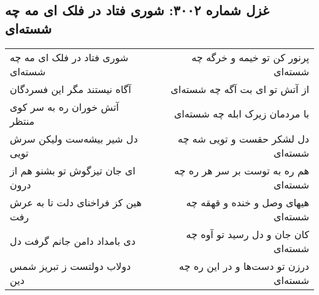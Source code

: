 \begin{center}
\section*{غزل شماره ۳۰۰۲: شوری فتاد در فلک ای مه چه شسته‌ای}
\label{sec:3002}
\begin{longtable}{l p{0.5cm} r}
شوری فتاد در فلک ای مه چه شسته‌ای
&&
پرنور کن تو خیمه و خرگه چه شسته‌ای
\\
آگاه نیستند مگر این فسردگان
&&
از آتش تو ای بت آگه چه شسته‌ای
\\
آتش خوران ره به سر کوی منتظر
&&
با مردمان زیرک ابله چه شسته‌ای
\\
دل شیر بیشه‌ست ولیکن سرش تویی
&&
دل لشکر حقست و تویی شه چه شسته‌ای
\\
ای جان تیزگوش تو بشنو هم از درون
&&
هم ره به توست بر سر هر ره چه شسته‌ای
\\
هین کز فراخنای دلت تا به عرش رفت
&&
هیهای وصل و خنده و قهقه چه شسته‌ای
\\
دی بامداد دامن جانم گرفت دل
&&
کان جان و دل رسید تو آوه چه شسته‌ای
\\
دولاب دولتست ز تبریز شمس دین
&&
درزن تو دست‌ها و در این ره چه شسته‌ای
\\
\end{longtable}
\end{center}
